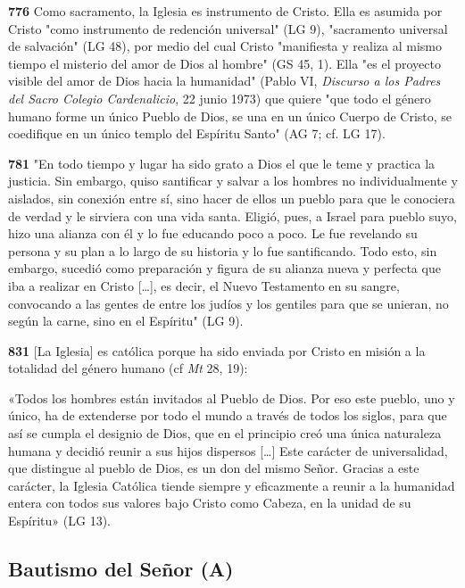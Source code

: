 \documentclass[]{article}
\begin{document}
\textbf{776} Como sacramento, la Iglesia es instrumento de Cristo. Ella
es asumida por Cristo "como instrumento de redención universal" (LG 9),
"sacramento universal de salvación" (LG 48), por medio del cual Cristo
"manifiesta y realiza al mismo tiempo el misterio del amor de Dios al
hombre" (GS 45, 1). Ella "es el proyecto visible del amor de Dios hacia
la humanidad" (Pablo VI, \emph{Discurso a los Padres del Sacro Colegio
Cardenalicio}, 22 junio 1973) que quiere "que todo el género humano
forme un único Pueblo de Dios, se una en un único Cuerpo de Cristo, se
coedifique en un único templo del Espíritu Santo" (AG 7; cf. LG 17).

\textbf{781} "En todo tiempo y lugar ha sido grato a Dios el que le teme
y practica la justicia. Sin embargo, quiso santificar y salvar a los
hombres no individualmente y aislados, sin conexión entre sí, sino hacer
de ellos un pueblo para que le conociera de verdad y le sirviera con una
vida santa. Eligió, pues, a Israel para pueblo suyo, hizo una alianza
con él y lo fue educando poco a poco. Le fue revelando su persona y su
plan a lo largo de su historia y lo fue santificando. Todo esto, sin
embargo, sucedió como preparación y figura de su alianza nueva y
perfecta que iba a realizar en Cristo [\ldots{}], es decir, el Nuevo
Testamento en su sangre, convocando a las gentes de entre los judíos y
los gentiles para que se unieran, no según la carne, sino en el
Espíritu" (LG 9).

\textbf{831} {[}La Iglesia{]} es católica porque ha sido enviada por
Cristo en misión a la totalidad del género humano (cf \emph{Mt} 28, 19):

«Todos los hombres están invitados al Pueblo de Dios. Por eso este
pueblo, uno y único, ha de extenderse por todo el mundo a través de
todos los siglos, para que así se cumpla el designio de Dios, que en el
principio creó una única naturaleza humana y decidió reunir a sus hijos
dispersos [\ldots{}] Este carácter de universalidad, que distingue al
pueblo de Dios, es un don del mismo Señor. Gracias a este carácter, la
Iglesia Católica tiende siempre y eficazmente a reunir a la humanidad
entera con todos sus valores bajo Cristo como Cabeza, en la unidad de su
Espíritu» (LG 13).



\subsection{Bautismo del Señor (A)}\label{bautismo-del-seuxf1or-a}
\end{document}
